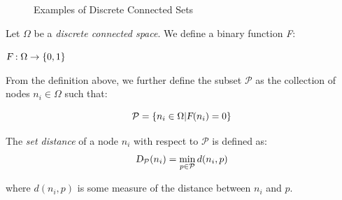 \documentclass[graybox]{svmult}
\newcommand{\PathSet}{\ensuremath{\mathcal P} }
\newcommand{\DCS}{\ensuremath{\Omega} }
\begin{document}
\begin{figure}[]
		\centering
          \caption{Examples of Discrete Connected Sets}
          \label{fig:DiscreteSets}
\end{figure}

\begin{definition}
Let $\Omega$ be a \emph{discrete connected space}. We define a binary function \textsl{F}:
\begin{center}
$ \textsl{F} : \Omega \rightarrow \{0,1 \} $
\end{center}
From the definition above, we further define the subset $\mathcal{P}$ as the collection of nodes $n_{i} \in \Omega$ such that:

\begin{equation}
\PathSet = \{ n_{i} \in \DCS | \textsl{F}(n_{i}) = 0 \}
\end{equation}

The \emph{set distance} of a node $n_{i}$ with respect to $\PathSet$ is defined as:
\begin{equation}
 \textsl{D}_{\PathSet}(n_{i}) = \min_{p \in \PathSet}{ d(n_{i},p) } 
\end{equation}

where $d(n_{i}, p)$ is some measure of the distance between $n_{i}$ and $p$. 
\end{definition}
\end{document}
